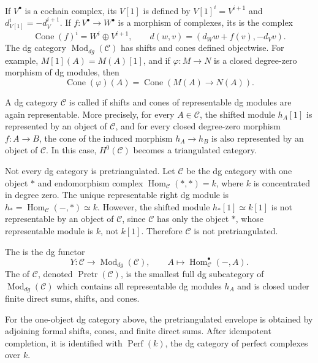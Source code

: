 {If \(V^\bullet\) is a cochain complex, its  \(V[1]\) is
defined by \(V[1]^i=V^{i+1}\) and \(d_{V[1]}^i=-d_V^{i+1}\).  If
\(f:V^\bullet\to W^\bullet\) is a morphism of complexes, its
 is the complex
\[
\operatorname{Cone}(f)^i=W^i\oplus V^{i+1},
\qquad
d(w,v)=(d_Ww+f(v),-d_Vv).
\]
The dg category \(\operatorname{Mod}_{dg}(\mathcal C)\) has shifts and
cones defined objectwise.  For example, \(M[1](A)=M(A)[1]\), and if
\(\varphi:M\to N\) is a closed degree-zero morphism of dg modules, then
\[
\operatorname{Cone}(\varphi)(A)
=
\operatorname{Cone}(M(A)\to N(A)).
\]

A dg category \(\mathcal C\) is called  if
shifts and cones of representable dg modules are again representable.
More precisely, for every \(A\in\mathcal C\), the shifted module
\(h_A[1]\) is represented by an object of \(\mathcal C\), and for every
closed degree-zero morphism \(f:A\to B\), the cone of the induced
morphism \(h_A\to h_B\) is also represented by an object of
\(\mathcal C\).  In this case, \(H^0(\mathcal C)\) becomes a
triangulated category.

Not every dg category is pretriangulated.  Let \(\mathcal C\) be the dg
category with one object \(*\) and endomorphism complex
\(\operatorname{Hom}_{\mathcal C}(*,*)=k\), where \(k\) is concentrated
in degree zero.  The unique representable right dg module is
\(h_*=\operatorname{Hom}_{\mathcal C}(-,*)\simeq k\).  However, the
shifted module \(h_*[1]\simeq k[1]\) is not representable by an object
of \(\mathcal C\), since \(\mathcal C\) has only the object \(*\), whose
representable module is \(k\), not \(k[1]\).  Therefore \(\mathcal C\)
is not pretriangulated.

The  is the dg functor
\[
Y:\mathcal C\longrightarrow \operatorname{Mod}_{dg}(\mathcal C),
\qquad
A\longmapsto \operatorname{Hom}_{\mathcal C}^{\bullet}(-,A).
\]
The  of \(\mathcal C\), denoted
\(\operatorname{Pretr}(\mathcal C)\), is the smallest full dg subcategory
of \(\operatorname{Mod}_{dg}(\mathcal C)\) which contains all
representable dg modules \(h_A\) and is closed under finite direct sums,
shifts, and cones.

For the one-object dg category above, the pretriangulated envelope is
obtained by adjoining formal shifts, cones, and finite direct sums.
After idempotent completion, it is identified with
\(\operatorname{Perf}(k)\), the dg category of perfect complexes over
\(k\).

}
